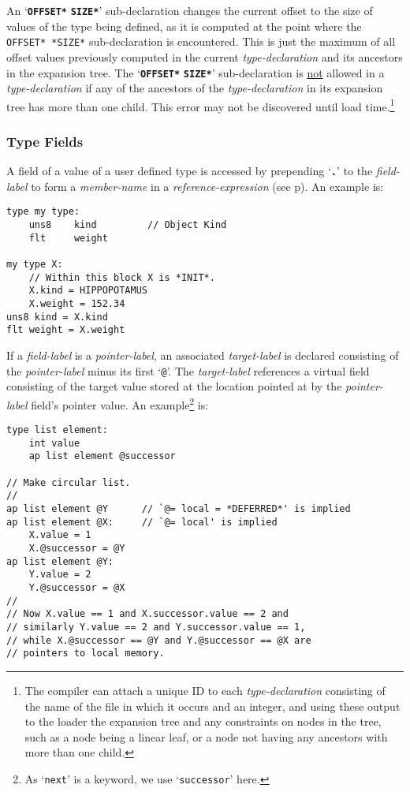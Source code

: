 \documentclass[12pt]{article}
\newcommand{\TT}[1]{{\tt \bfseries #1}}
\newcommand{\ttkey}[1]{{\tt \bfseries #1}}
\newcommand{\pagref}[1]{p\pageref{#1}}
\newenvironment{indpar}[1][0.3in]%
	{\begin{list}{}%
		     {\setlength{\itemsep}{0in}%
		      \setlength{\topsep}{0in}%
		      \setlength{\parsep}{1ex}%
		      \setlength{\labelwidth}{#1}%
		      \setlength{\leftmargin}{#1}%
		      \addtolength{\leftmargin}{\labelsep}}%
	 \item}%
	{\end{list}}
\begin{document}
An `\ttkey{*OFFSET*} \ttkey{*SIZE*}'\label{OFFSET-SIZE} sub-declaration
changes the current offset to the size of values of the type
being defined, as it is computed at the point where the {\tt *OFFSET* *SIZE*}
sub-declaration is encountered.  This is just the maximum of all
offset values previously computed in the current {\em type-declaration}
and its ancestors in the expansion tree.
The `\ttkey{*OFFSET*} \ttkey{*SIZE*}' sub-declaration
is \underline{not} allowed in a {\em type-declaration}
if any of the ancestors of the {\em type-declaration} in its expansion
tree has more than one child.  This error may not be discovered until
load time.\footnote{
The compiler can attach a unique ID to each {\em type-declaration}
consisting of the name of the file in which it occurs and an integer,
and using these output to the loader the expansion tree and any constraints
on nodes in the tree, such as a node being a linear leaf, or a node not
having any ancestors with more than one child.}

\subsubsection{Type Fields}

A field of a value of a user defined type is accessed by prepending
`\TT{.}' to the {\em field-label} to form a {\em member-name} in
a {\em reference-expression} (see \pagref{FIELD-SELECTION}).
An example is:

\begin{indpar}\begin{verbatim}
type my type:
    uns8    kind         // Object Kind
    flt     weight

my type X:
    // Within this block X is *INIT*.
    X.kind = HIPPOPOTAMUS
    X.weight = 152.34
uns8 kind = X.kind
flt weight = X.weight
\end{verbatim}\end{indpar}

If a {\em field-label} is a {\em pointer-label}, an
associated {\em target-label} is declared consisting of the
{\em pointer-label} minus its first `{\tt @}'.  The {\em target-label}
references a virtual field consisting of the target value stored
at the location pointed at by the {\em pointer-label} field's pointer value.
An example\footnote{As `{\tt next}' is a keyword, we use `{\tt successor}'
here.} is:

\begin{indpar}\begin{verbatim}
type list element:
    int value
    ap list element @successor

// Make circular list.
//
ap list element @Y      // `@= local = *DEFERRED*' is implied
ap list element @X:     // `@= local' is implied
    X.value = 1
    X.@successor = @Y
ap list element @Y:
    Y.value = 2
    Y.@successor = @X
//
// Now X.value == 1 and X.successor.value == 2 and
// similarly Y.value == 2 and Y.successor.value == 1,
// while X.@successor == @Y and Y.@successor == @X are
// pointers to local memory.
\end{verbatim}\end{indpar}
\end{document}
